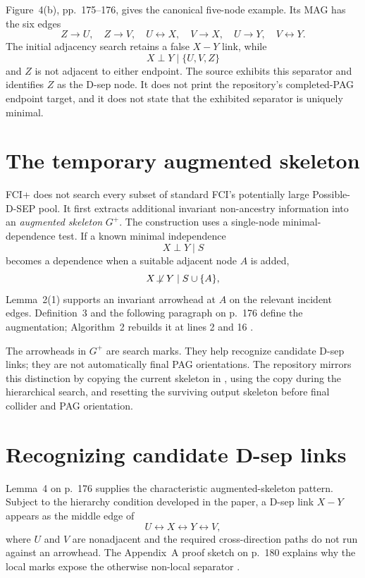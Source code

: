 \documentclass[11pt,a4paper,oneside]{report}
\begin{document}
Figure~4(b), pp.~175--176, gives the canonical five-node example.  Its MAG has
the six edges
\[
  Z\to U,\quad Z\to V,\quad
  U\leftrightarrow X,\quad V\to X,\quad
  U\to Y,\quad V\leftrightarrow Y.
\]
The initial adjacency search retains a false \(X-Y\) link, while
\[
  X\perp Y\mid\{U,V,Z\}
\]
and \(Z\) is not adjacent to either endpoint.  The source exhibits this
separator and identifies \(Z\) as the D-sep node.  It does not print the
repository's completed-PAG endpoint target, and it does not state that the
exhibited separator is uniquely minimal.

\section{The temporary augmented skeleton}

FCI+ does not search every subset of standard FCI's potentially large
Possible-D-SEP pool.  It first extracts additional invariant non-ancestry
information into an \emph{augmented skeleton} \(G^+\).  The construction uses
a single-node minimal-dependence test.  If a known minimal independence
\[
  X\perp Y\mid S
\]
becomes a dependence when a suitable adjacent node \(A\) is added,
\[
  X\not\!\perp Y\mid S\cup\{A\},
\]
Lemma~2(1) supports an invariant arrowhead at \(A\) on the relevant incident
edges.  Definition~3 and the following paragraph on p.~176 define the
augmentation; Algorithm~2 rebuilds it at lines 2 and 16
\citep{claassen2013learning}.

The arrowheads in \(G^+\) are search marks.  They help recognize candidate
D-sep links; they are not automatically final PAG orientations.  The
repository mirrors this distinction by copying the current skeleton in
, using the copy during the hierarchical
search, and resetting the surviving output skeleton before final collider and
PAG orientation.

\section{Recognizing candidate D-sep links}

Lemma~4 on p.~176 supplies the characteristic augmented-skeleton pattern.
Subject to the hierarchy condition developed in the paper, a D-sep link
\(X-Y\) appears as the middle edge of
\[
  U\leftrightarrow X\leftrightarrow Y\leftrightarrow V,
\]
where \(U\) and \(V\) are nonadjacent and the required cross-direction paths
do not run against an arrowhead.  The Appendix~A proof sketch on p.~180
explains why the local marks expose the otherwise non-local separator
\citep{claassen2013learning}.
\end{document}

